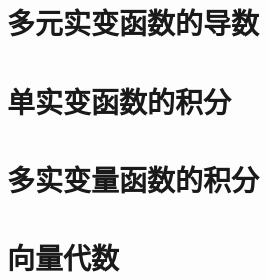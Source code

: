 \chapter{多元实变函数的导数}










\chapter{单实变函数的积分}










\chapter{多实变量函数的积分}











\chapter{向量代数}



